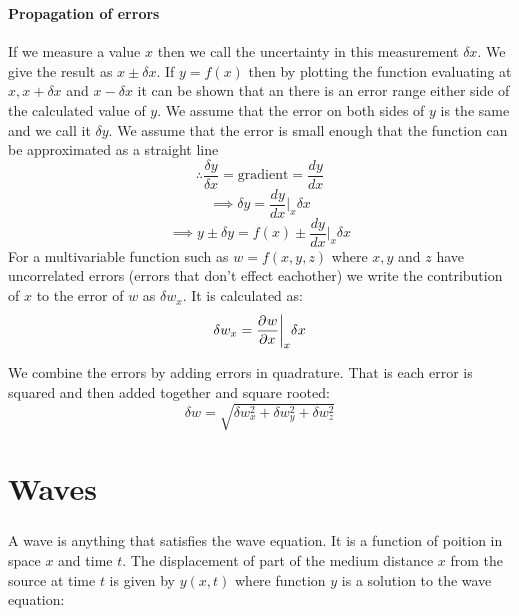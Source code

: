 \section{}

\subsection*{Propagation of errors}

If we measure a value \(x\) then we call the uncertainty in this measurement \(\delta x\). We give the result as \(x\pm\delta x\). If \(y=f(x)\) then by plotting the function evaluating at \(x,x+\delta x\) and \(x-\delta x\) it can be shown that an there is an error range either side of the calculated value of \(y\). We assume that the error on both sides of \(y\) is the same and we call it \(\delta y\). We assume that the error is small enough that the function can be approximated as a straight line
\[\therefore \frac{\delta y}{\delta x}=\text{gradient}=\frac{dy}{dx}\]
\[\implies\delta y=\frac{dy}{dx}\biggr|_x\delta x\]
\[\implies y\pm\delta y=f(x)\pm\frac{dy}{dx}\biggr|_x\delta x\]
For a multivariable function such as \(w=f(x,y,z)\) where \(x,y\) and \(z\) have uncorrelated errors (errors that don't effect eachother) we write the contribution of \(x\) to the error of \(w\) as \(\delta w_x\). It is calculated as:
\[\delta w_x=\frac{\partial^{}{w}}{\partial{x}^{}}\biggr|_x\delta x\]

We combine the errors by adding errors in quadrature. That is each error is squared and then added together and square rooted:
\[\delta w=\sqrt{\delta w_x^2+\delta w_y^2+\delta w_z^2}\]

\part{Waves}
\section{}

A wave is anything that satisfies the wave equation. It is a function of poition in space \(x\) and time \(t\). The displacement of part of the medium distance \(x\) from the source at time \(t\) is given by \(y(x,t)\) where function \(y\) is a solution to the wave equation:
\begin{center}
\end{center}

